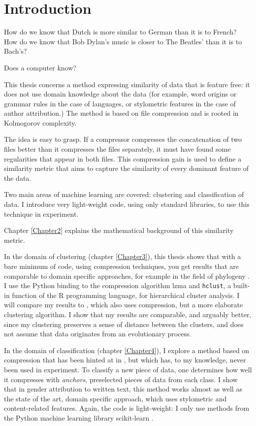 
\chapter{Introduction} %

\label{Intro} %


How do we know that Dutch is more similar to German than it is to French? How do we know that Bob Dylan's music is closer to The Beatles' than it is to Bach's?

Does a computer know?

This thesis concerns a method expressing similarity of data that is feature free: it does not use domain knowledge about the data (for example, word origins or grammar rules in the case of languages, or stylometric features in the case of author attribution.) The method is based on file compression and is rooted in Kolmogorov complexity.

The idea is easy to grasp. If a compressor compresses the concatenation of two files better than it compresses the files separately, it must have found some regularities that appear in both files. This compression gain is used to define a similarity metric that aims to capture the similarity of every dominant feature of the data.

Two main areas of machine learning are covered: clustering and classification of data. I introduce very light-weight code, using only standard libraries, to use this technique in experiment.

Chapter \ref{Chapter2} explains the mathematical background of this similarity metric.

In the domain of clustering (chapter \ref{Chapter3}), this thesis shows that with a bare minimum of code, using compression techniques, you get results that are comparable to domain specific approaches, for example in the field of phylogeny \cite{Cao1998}. I use the Python binding to the compression algorithm lzma and \lstinline{hclust}, a built-in function of the R programming language, for hierarchical cluster analysis. I will compare my results to \cite{Cilibrasi2005}, which also uses compression, but a more elaborate clustering algorithm. I show that my results are comparable, and arguably better, since my clustering preserves a sense of distance between the clusters, and does not assume that data originates from an evolutionary process.

In the domain of classification (chapter \ref{Chapter4}),  I explore a method based on compression that has been hinted at in \cite{Cilibrasi2007}, but which has, to my knowledge, never been used in experiment. To classify a new piece of data, one determines how well it compresses with \emph{anchors}, preselected pieces of data from each class. I show that in gender attribution to written text, this method works almost as well as the state of the art, domain specific approach, which uses stylometric and content-related features. Again, the code is light-weight: I only use methods from the Python machine learning library scikit-learn \cite{Pedregosa2011}.
